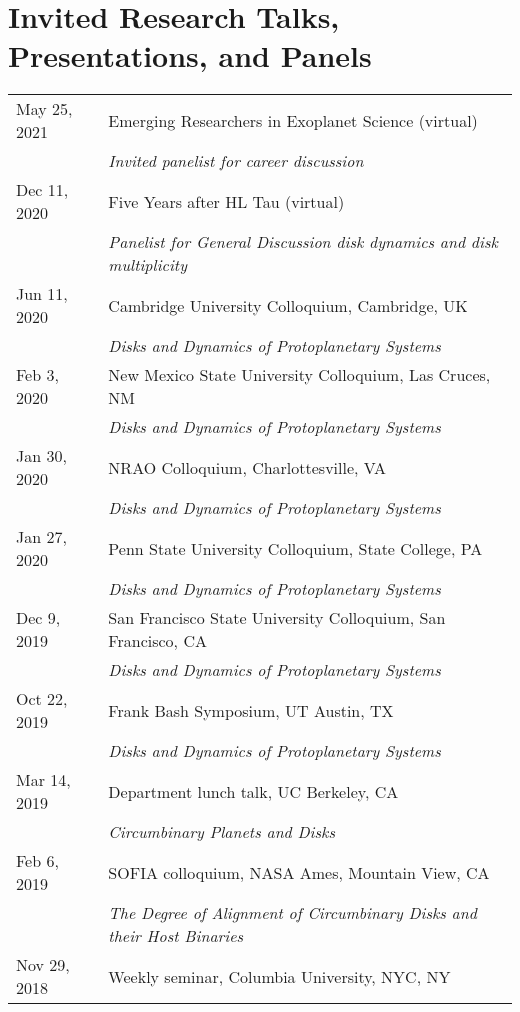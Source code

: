 \section*{Invited Research Talks, Presentations, and Panels}
\setlength\LTleft{0pt}
\setlength\LTright{0pt}
\begin{longtable}{@{\hspace{10pt}}p{1.2in}l}
  May 25, 2021 & Emerging Researchers in Exoplanet Science (virtual)\\
  & \emph{Invited panelist for career discussion} \\[\rowskip]
  Dec 11, 2020 & Five Years after HL Tau (virtual) \\ 
  & \emph{Panelist for General Discussion disk dynamics and disk multiplicity} \\[\rowskip]
  Jun 11, 2020 & Cambridge University Colloquium, Cambridge, UK \\ 
  & \emph{Disks and Dynamics of Protoplanetary Systems} \\[\rowskip]
  Feb 3, 2020 & New Mexico State University Colloquium, Las Cruces, NM \\
  & \emph{Disks and Dynamics of Protoplanetary Systems} \\[\rowskip]
  Jan 30, 2020 & NRAO Colloquium, Charlottesville, VA \\
  & \emph{Disks and Dynamics of Protoplanetary Systems} \\[\rowskip]
  Jan 27, 2020 & Penn State University Colloquium, State College, PA \\
  & \emph{Disks and Dynamics of Protoplanetary Systems} \\[\rowskip]
  Dec 9, 2019 & San Francisco State University Colloquium, San Francisco, CA \\
  & \emph{Disks and Dynamics of Protoplanetary Systems} \\[\rowskip]
  Oct 22, 2019 & Frank Bash Symposium, UT Austin, TX \\
  & \emph{Disks and Dynamics of Protoplanetary Systems} \\[\rowskip]
  Mar 14, 2019 & Department lunch talk, UC Berkeley, CA \\
  & \emph{Circumbinary Planets and Disks} \\[\rowskip]
  Feb 6, 2019 & SOFIA colloquium, NASA Ames, Mountain View, CA \\
  & \emph{The Degree of Alignment of Circumbinary Disks and their Host Binaries} \\[\rowskip]
  Nov 29, 2018 & Weekly seminar, Columbia University, NYC, NY \\

\end{longtable}
